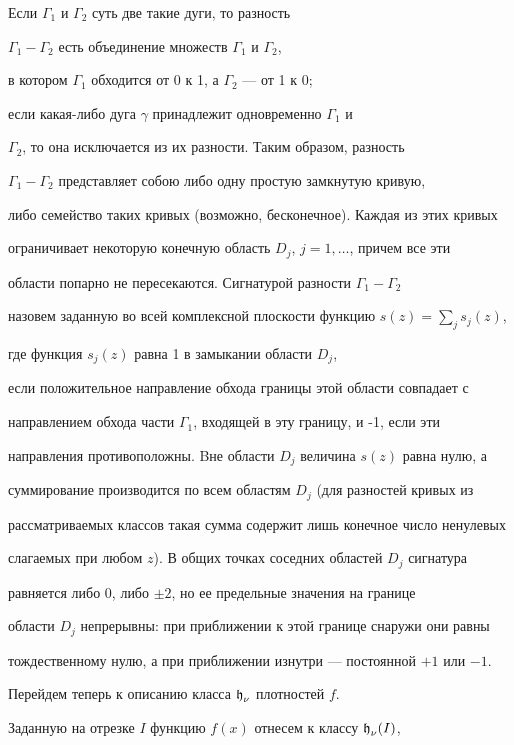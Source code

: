 Если $\Gamma_1$ и $\Gamma_2$ суть две такие дуги, то разность


$\Gamma_1 - \Gamma_2$ есть объединение множеств $\Gamma_1$ и $\Gamma_2$,


в котором $\Gamma_1$ обходится от 0 к 1, а $\Gamma_2$ --- от 1 к 0;


если какая-либо дуга $\gamma$ принадлежит одновременно $\Gamma_1$ и


$\Gamma_2$, то она исключается из их разности. Таким образом, разность


$\Gamma_1 - \Gamma_2$ представляет собою либо одну простую замкнутую кривую,


либо семейство таких кривых (возможно, бесконечное). Каждая из этих кривых


ограничивает некоторую конечную область $D_j$, $j = 1,\dotsc$, причем все эти


области попарно не пересекаются. Сигнатурой разности $\Gamma_1 - \Gamma_2$


назовем заданную во всей комплексной плоскости функцию $s(z)=


\sum\limits_{j}{s_{j}(z)}$,


где функция $s_{j}(z)$ равна 1 в замыкании области $D_j$,


если положительное направление обхода границы этой области совпадает с


направлением обхода части $\Gamma_1$, входящей в эту границу, и -1, если эти


направления противоположны. Bне области $D_j$ величина $s(z)$ равна нулю, а


суммирование производится по всем областям $D_j$ (для разностей кривых из


рассматриваемых классов такая сумма содержит лишь конечное число ненулевых


слагаемых при любом $z$). В общих точках соседних областей $D_j$ сигнатура


равняется либо 0, либо $\pm 2$, но ее предельные значения на границе


области $D_j$ непрерывны: при приближении к этой границе снаружи они равны


тождественному нулю, а при приближении изнутри --- постоянной $+1$ или $-1$.





Перейдем теперь к описанию класса $\operatorname{\frak h}_{\nu}$ плотностей $f$.


Заданную на отрезке $I$ функцию $f(x)$ отнесем к классу $\operatorname{\frak h}_{\nu}(I)$,


